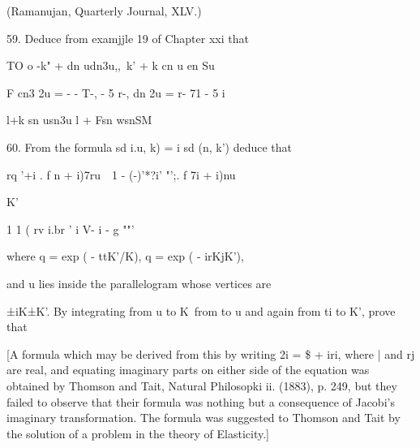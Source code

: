 (Ramanujan, Quarterly Journal, XLV.)

59. Deduce from examjjle 19 of Chapter xxi that

TO o -k" + dn udn3u,,\ k' + k cn u en Su

F cn3 2u = - - T-, - 5 r-, dn 2u = r- 71 - 5 i~ 

l+k sn usn3u l + Fsn wsnSM


60. From the formula sd i.u, k) = i sd (n, k') deduce that

rq '+i . f n + i)7ru\ \ 1 - (-)'*?i' "';. f 7i + i)nu

K'

1 1 ( rv i.br ' i V- i - g ""'

where q = exp ( - ttK'/K), q = exp ( - irKjK'),

and u lies inside the parallelogram whose vertices are

±iK±K'. By integrating from u to K\ from to u and again from ti to K',
prove that

[A formula which may be derived from this by writing 2i = \$ + iri,
where | and rj are real, and equating imaginary parts on either side
of the equation was obtained by Thomson and Tait, Natural Philosopki
ii. (1883), p. 249, but they failed to observe that their formula was
nothing but a consequence of Jacobi's imaginary transformation. The
formula was suggested to Thomson and Tait by the solution of a problem
in the theory of Elasticity.]

